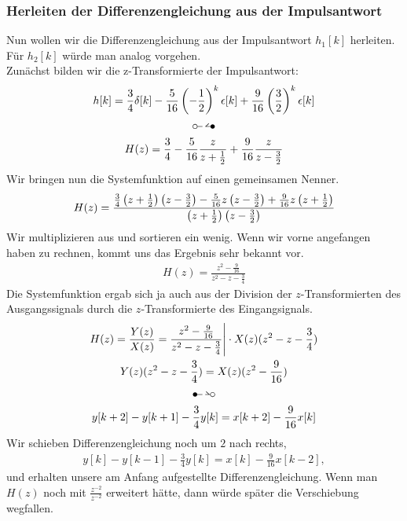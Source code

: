 \documentclass[11pt,a4paper,DIV=12]{scrartcl}
\begin{document}
\subsubsection{Herleiten der Differenzengleichung aus der Impulsantwort}
%
Nun wollen wir die Differenzengleichung aus der Impulsantwort $h_1[k]$
herleiten.
%
Für $h_2[k]$ würde man analog vorgehen.\\
%
Zunächst bilden wir die z-Transformierte der Impulsantwort:
%
\begin{gather}
	h[k]=\frac{3}{4}\delta[k]-\frac{5}{16}\left(-\frac{1}{2}\right)^k\epsilon[k]+\frac{9}{16}\left(\frac{3}{2}\right)^k\epsilon[k]\\
	\ztransf\nonumber\\
	H(z)=\frac{3}{4}-\frac{5}{16}\frac{z}{z+\frac{1}{2}}+\frac{9}{16}\frac{z}{z-\frac{3}{2}}
\end{gather}
%
Wir bringen nun die Systemfunktion auf einen gemeinsamen Nenner.
%
\begin{align}
	H(z)=
	\frac{
		\frac{3}{4}\left(z+\frac{1}{2}\right)\left(z-\frac{3}{2}\right)-\frac{5}{16}z\left(z-\frac{3}{2}\right)+\frac{9}{16}z\left(z+\frac{1}{2}\right)
	}
	{
		\left(z+\frac{1}{2}\right)\left(z-\frac{3}{2}\right)
	}
\end{align}
%
Wir multiplizieren aus und sortieren ein wenig. Wenn wir vorne angefangen haben
zu rechnen, kommt uns das Ergebnis sehr bekannt vor.
%
\begin{gather}
	H(z)=\frac{z^2-\frac{9}{16}}{z^2-z-\frac{3}{4}}
\end{gather}
%
Die Systemfunktion ergab sich ja auch aus der Division der $z$-Transformierten
des Ausgangssignals durch die $z$-Transformierte des Eingangsignals.
%
\begin{gather}
	H(z)=\frac{Y(z)}{X(z)}=\frac{z^2-\frac{9}{16}}{z^2-z-\frac{3}{4}}\Bigg |\cdot X(z)(z^2-z-\frac{3}{4})\\
	Y(z)(z^2-z-\frac{3}{4})=X(z)(z^2-\frac{9}{16})\\
	\Ztransf\nonumber \\
	y[k+2]-y[k+1]-\frac{3}{4}y[k]=x[k+2]-\frac{9}{16}x[k]
\end{gather}
%
Wir schieben Differenzengleichung noch um $2$ nach rechts,
%
\begin{align}
	y[k]-y[k-1]-\frac{3}{4}y[k]=x[k]-\frac{9}{16}x[k-2],
\end{align}
%
und erhalten unsere am Anfang aufgestellte Differenzengleichung.
%
Wenn man $H(z)$ noch mit $\frac{z^{-2}}{z^{-2}}$ erweitert hätte,
dann würde später die Verschiebung wegfallen.
%
\newpage
\end{document}
